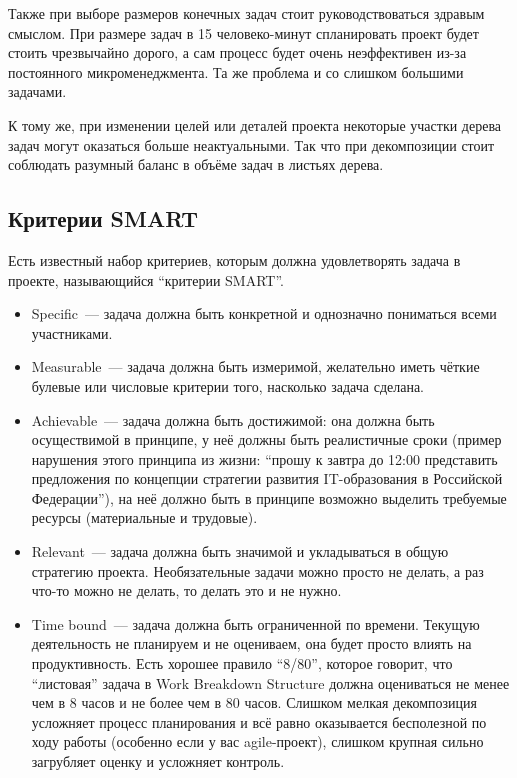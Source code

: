 \documentclass{../../text-style}
\begin{document}
Также при выборе размеров конечных задач стоит руководствоваться здравым смыслом. При размере задач в 15 человеко-минут спланировать проект будет стоить чрезвычайно дорого, а сам процесс будет очень неэффективен из-за постоянного микроменеджмента. Та же проблема и со слишком большими задачами.

К тому же, при изменении целей или деталей проекта некоторые участки дерева задач могут оказаться больше неактуальными. Так что при декомпозиции стоит соблюдать разумный баланс в объёме задач в листьях дерева.

\subsection{Критерии SMART}

Есть известный набор критериев, которым должна удовлетворять задача в проекте, называющийся \enquote{критерии SMART}.

\begin{itemize}
    \item Specific~--- задача должна быть конкретной и однозначно пониматься всеми участниками.
    \item Measurable~--- задача должна быть измеримой, желательно иметь чёткие булевые или числовые критерии того, насколько задача сделана.
    \item Achievable~--- задача должна быть достижимой: она должна быть осуществимой в принципе, у неё должны быть реалистичные сроки (пример нарушения этого принципа из жизни: \enquote{прошу к завтра до 12:00 представить предложения по концепции стратегии развития IT-образования в Российской Федерации}), на неё должно быть в принципе возможно выделить требуемые ресурсы (материальные и трудовые).
    \item Relevant~--- задача должна быть значимой и укладываться в общую стратегию проекта. Необязательные задачи можно просто не делать, а раз что-то можно не делать, то делать это и не нужно.
    \item Time bound~--- задача должна быть ограниченной по времени. Текущую деятельность не планируем и не оцениваем, она будет просто влиять на продуктивность. Есть хорошее правило \enquote{8/80}, которое говорит, что \enquote{листовая} задача в Work Breakdown Structure должна оцениваться не менее чем в 8 часов и не более чем в 80 часов. Слишком мелкая декомпозиция усложняет процесс планирования и всё равно оказывается бесполезной по ходу работы (особенно если у вас agile-проект), слишком крупная сильно загрубляет оценку и  усложняет контроль.
\end{itemize}
\end{document}
